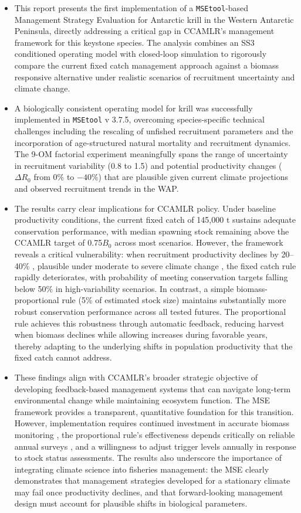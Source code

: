 \documentclass[
]{article}
\begin{document}
\begin{itemize}
\item
  This report presents the first implementation of a \texttt{MSEtool}-based Management Strategy Evaluation for Antarctic krill in the Western Antarctic Peninsula, directly addressing a critical gap in CCAMLR's management framework for this keystone species. The analysis combines an SS3 conditioned operating model with closed-loop simulation to rigorously compare the current fixed catch management approach against a biomass responsive alternative under realistic scenarios of recruitment uncertainty and climate change.
\item
  A biologically consistent operating model for krill was successfully implemented in \texttt{MSEtool} v 3.7.5, overcoming species-specific technical challenges including the rescaling of unfished recruitment parameters and the incorporation of age-structured natural mortality and recruitment dynamics. The 9-OM factorial experiment meaningfully spans the range of uncertainty in recruitment variability (0.8 to 1.5) and potential productivity changes (\(\Delta R_0\) from 0\% to \(-40\%\)) that are plausible given current climate projections and observed recruitment trends in the WAP.
\item
  The results carry clear implications for CCAMLR policy. Under baseline productivity conditions, the current fixed catch of 145,000 t sustains adequate conservation performance, with median spawning stock remaining above the CCAMLR target of 0.75\(B_0\) across most scenarios. However, the framework reveals a critical vulnerability: when recruitment productivity declines by 20--40\% , plausible under moderate to severe climate change , the fixed catch rule rapidly deteriorates, with probability of meeting conservation targets falling below 50\% in high-variability scenarios. In contrast, a simple biomass-proportional rule (5\% of estimated stock size) maintains substantially more robust conservation performance across all tested futures. The proportional rule achieves this robustness through automatic feedback, reducing harvest when biomass declines while allowing increases during favorable years, thereby adapting to the underlying shifts in population productivity that the fixed catch cannot address.
\item
  These findings align with CCAMLR's broader strategic objective of developing feedback-based management systems that can navigate long-term environmental change while maintaining ecosystem function. The MSE framework provides a transparent, quantitative foundation for this transition. However, implementation requires continued investment in accurate biomass monitoring , the proportional rule's effectiveness depends critically on reliable annual surveys , and a willingness to adjust trigger levels annually in response to stock status assessments. The results also underscore the importance of integrating climate science into fisheries management: the MSE clearly demonstrates that management strategies developed for a stationary climate may fail once productivity declines, and that forward-looking management design must account for plausible shifts in biological parameters.

\end{itemize}
\end{document}
